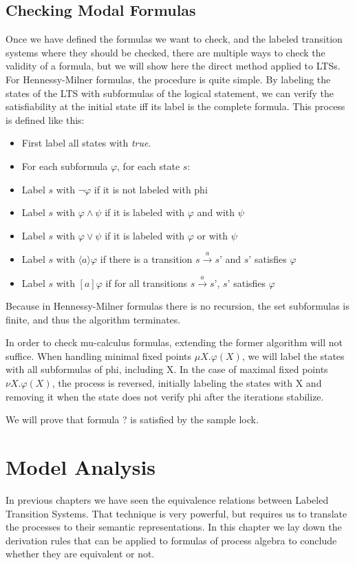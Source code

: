 \documentclass[11pt]{article}
\theoremstyle{definition}
\theoremstyle{plain}
\theoremstyle{definition}
\let\temp\phi
\let\phi\varphi
\let\varphi\temp
\begin{document}
\subsection{Checking Modal Formulas}
Once we have defined the formulas we want to check, and the labeled transition systems where they should be checked, there are multiple ways to check the validity of a formula, but we will show here the direct method applied to LTSs.
For Hennessy-Milner formulas, the procedure is quite simple. By labeling the states of the LTS with subformulas of the logical statement, we can verify the satisfiability at the initial state iff its label is the complete formula.
This process is defined like this:
\begin{itemize}
	\item First label all states with \textit{true}.
	\item For each subformula $\phi$, for each state $s$:
	\item Label $s$ with $\neg \phi$ if it is not labeled with phi
	\item Label $s$ with $\phi \wedge \psi$ if it is labeled with $\phi$ and with $\psi$
	\item Label $s$ with $\phi \vee \psi$ if it is labeled with $\phi$ or with $\psi$
	\item Label $s$ with $\langle a \rangle\phi$ if there is a transition $s\xrightarrow{a}s’$ and $s’$ satisfies $\phi$
	\item Label $s$ with $[a]\phi$ if for all transitions $s\xrightarrow{a}s’$, $s’$ satisfies $\phi$
\end{itemize}

Because in Hennessy-Milner formulas there is no recursion, the set subformulas is finite, and thus the algorithm terminates.

In order to check mu-calculus formulas, extending the former algorithm will not suffice. When handling minimal fixed points $ \mu X.\phi(X) $, we will label the states with all subformulas of phi, including X. In the case of maximal fixed points $ \nu X.\phi(X) $, the process is reversed, initially labeling the states with X and removing it when the state does not verify phi after the iterations stabilize.

We will prove that formula ? is satisfied by the sample lock. %

\clearpage

\section{Model Analysis}
In previous chapters we have seen the equivalence relations between Labeled Transition Systems. That technique is very powerful, but requires us to translate the processes to their semantic representations. In this chapter we lay down the derivation rules that can be applied to formulas of process algebra to conclude whether they are equivalent or not.
\end{document}
